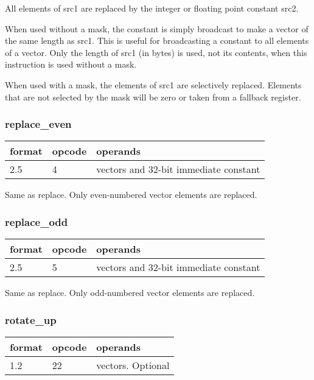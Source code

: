\documentclass[forwardcom.tex]{subfiles}
\begin{document}
All elements of src1 are replaced by the integer or floating point constant src2.
\vspace{2mm}

When used without a mask, the constant is simply broadcast to make a vector of the same length as src1. This is useful for broadcasting a constant to all elements of a vector. Only the length of src1 (in bytes) is used, not its contents, when this instruction is used without a mask.
\vspace{2mm}

When used with a mask, the elements of src1 are selectively replaced. Elements that are not selected by the mask will be zero or taken from a fallback register.

\subsubsection{replace\_even}
\label{table:replaceEvenInstruction}
\begin{tabular}{|p{12mm}|p{12mm}|p{110mm}|}
\hline
\bfseries format & \bfseries opcode & \bfseries operands \\ \hline
2.5 & 4 & vectors and 32-bit immediate constant \\ \hline
\end{tabular}
\vspace{2mm}

Same as replace. Only even-numbered vector elements are replaced.

\subsubsection{replace\_odd}
\label{table:replaceOddInstruction}
\begin{tabular}{|p{12mm}|p{12mm}|p{110mm}|}
\hline
\bfseries format & \bfseries opcode & \bfseries operands \\ \hline
2.5 & 5 & vectors and 32-bit immediate constant \\ \hline
\end{tabular}
\vspace{2mm}

Same as replace. Only odd-numbered vector elements are replaced.

\subsubsection{rotate\_up}
\label{table:rotateUpInstruction}
\begin{tabular}{|p{12mm}|p{12mm}|p{110mm}|}
\hline
\bfseries format & \bfseries opcode & \bfseries operands \\ \hline
1.2 & 22 & vectors. Optional \\ \hline
\end{tabular}
\vspace{2mm}
\end{document}
